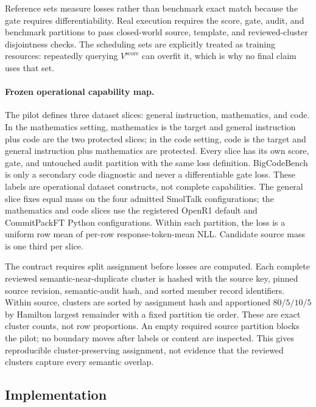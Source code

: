 \documentclass{article}
\begin{document}
Reference sets measure losses rather than benchmark exact match because the
gate requires differentiability. Real execution requires the score, gate,
audit, and benchmark partitions to pass closed-world source, template, and
reviewed-cluster disjointness checks. The scheduling sets are explicitly
treated as training resources: repeatedly querying $V^{\mathrm{score}}$ can
overfit it, which is why no final claim uses that set.

\paragraph{Frozen operational capability map.}
The pilot defines three dataset slices: general instruction, mathematics, and
code. In the mathematics setting, mathematics is the target and general
instruction plus code are the two protected slices; in the code setting, code
is the target and general instruction plus mathematics are protected. Every
slice has its own score, gate, and untouched audit partition with the same loss
definition. BigCodeBench is only a secondary code diagnostic and never a
differentiable gate loss. These labels are operational dataset constructs, not
complete capabilities. The general slice fixes equal mass on the four admitted
SmolTalk configurations; the mathematics and code slices use the registered
OpenR1 default and CommitPackFT Python configurations. Within each partition,
the loss is a uniform row mean of per-row response-token-mean NLL. Candidate
source mass is one third per slice.

The contract requires split assignment before losses are computed. Each complete reviewed
semantic-near-duplicate cluster is hashed with the source key, pinned source
revision, semantic-audit hash, and sorted member record identifiers.
Within source, clusters are sorted by assignment hash and apportioned
$80/5/10/5$ by Hamilton largest remainder with a fixed partition tie order.
These are exact cluster counts, not row proportions. An empty required source
partition blocks the pilot; no boundary moves after labels or content are
inspected. This gives
reproducible cluster-preserving assignment, not evidence that the reviewed
clusters capture every semantic overlap.

\subsection{Implementation}
\end{document}
